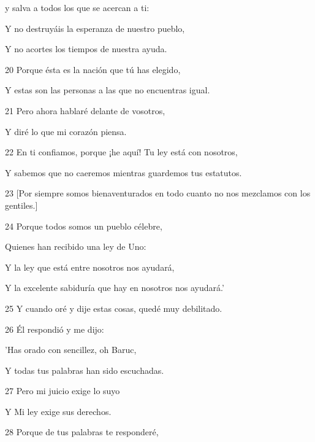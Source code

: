 \par y salva a todos los que se acercan a ti:

\par Y no destruyáis la esperanza de nuestro pueblo,

\par Y no acortes los tiempos de nuestra ayuda.

\par 20 Porque ésta es la nación que tú has elegido,

\par Y estas son las personas a las que no encuentras igual.

\par 21 Pero ahora hablaré delante de vosotros,

\par Y diré lo que mi corazón piensa.

\par 22 En ti confiamos, porque ¡he aquí! Tu ley está con nosotros,

Y sabemos que no caeremos mientras guardemos tus estatutos.

\par 23 [Por siempre somos bienaventurados en todo cuanto no nos mezclamos con los gentiles.]

\par 24 Porque todos somos un pueblo célebre,

\par Quienes han recibido una ley de Uno:

\par Y la ley que está entre nosotros nos ayudará,

Y la excelente sabiduría que hay en nosotros nos ayudará.'

\par 25 Y cuando oré y dije estas cosas, quedé muy debilitado.

\par 26 Él respondió y me dijo:

\par 'Has orado con sencillez, oh Baruc,

\par Y todas tus palabras han sido escuchadas.

\par 27 Pero mi juicio exige lo suyo

\par Y Mi ley exige sus derechos.

\par 28 Porque de tus palabras te responderé,

